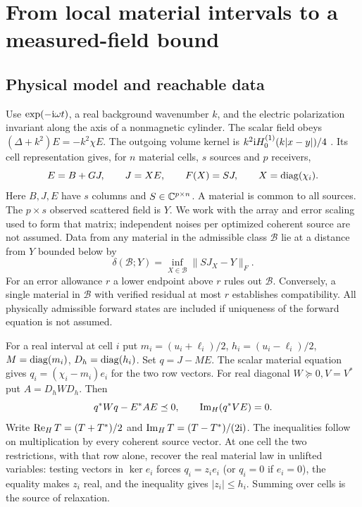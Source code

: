 \section{From local material intervals to a measured-field bound}\label{sec:theory}
\subsection{Physical model and reachable data}
Use $\exp(-{\rm i}\omega t)$, a real background wavenumber $k$, and the electric polarization invariant along the axis of a nonmagnetic cylinder. The scalar field obeys $(\Delta+k^2)E=-k^2\chi E$. The outgoing volume kernel is $k^2 {\rm i}H_0^{(1)}(k|x-y|)/4$ \cite{colton,richmond}. Its cell representation gives, for $n$ material cells, $s$ sources and $p$ receivers,
\begin{equation}
 E=B+GJ,\qquad J=XE,\qquad F(X)=SJ,\qquad X=\operatorname{diag}(\chi_i).
 \label{eq:vie}
\end{equation}
Here $B,J,E$ have $s$ columns and $S\in\mathbb C^{p\times n}$. A material is common to all sources. The $p\times s$ observed scattered field is $Y$. We work with the array and error scaling used to form that matrix; independent noises per optimized coherent source are not assumed. Data from any material in the admissible class $\mathcal B$ lie at a distance from $Y$ bounded below by
\begin{equation}
 \delta(\mathcal B;Y)=\inf_{X\in\mathcal B}\|SJ_X-Y\|_F.
 \label{eq:distance}
\end{equation}
For an error allowance $r$ a lower endpoint above $r$ rules out $\mathcal B$. Conversely, a single material in $\mathcal B$ with verified residual at most $r$ establishes compatibility. All physically admissible forward states are included if uniqueness of the forward equation is not assumed.

For a real interval at cell $i$ put $m_i=(u_i+\ell_i)/2$, $h_i=(u_i-\ell_i)/2$, $M=\operatorname{diag}(m_i)$, $D_h=\operatorname{diag}(h_i)$. Set $q=J-ME$. The scalar material equation gives $q_i=(\chi_i-m_i)e_i$ for the two row vectors. For real diagonal $W\succeq0,V=V^*$ put $A=D_h W D_h$. Then
\begin{equation}
 q^*Wq-E^*AE\preceq0,\qquad \operatorname{Im}_{H}(q^*VE)=0 .
 \label{eq:row}
\end{equation}
Write $\operatorname{Re}_{H} T=(T+T^*)/2$ and $\operatorname{Im}_{H} T=(T-T^*)/(2{\rm i})$. The inequalities follow on multiplication by every coherent source vector. At one cell the two restrictions, with that row alone, recover the real material law in unlifted variables: testing vectors in $\ker e_i$ forces $q_i=z_i e_i$ (or $q_i=0$ if $e_i=0$), the equality makes $z_i$ real, and the inequality gives $|z_i|\le h_i$. Summing over cells is the source of relaxation.

